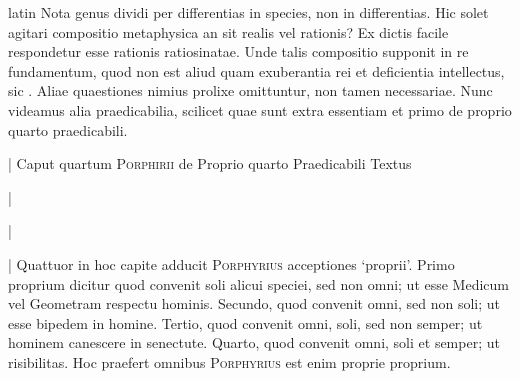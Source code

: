 \begin{otherlanguage*}{latin}
\pstart
Nota genus dividi per differentias in species, non in differentias. Hic solet agitari compositio metaphysica an sit realis vel rationis? Ex dictis facile respondetur esse rationis ratiosinatae. Unde talis compositio supponit in re fundamentum, quod non est aliud quam exuberantia rei et deficientia intellectus, sic . Aliae quaestiones nimius prolixe omittuntur, non tamen necessariae. Nunc videamus alia praedicabilia, scilicet quae sunt extra essentiam et primo de proprio quarto praedicabili. 
\pend

\pstart
{}
\pend

\pstart
{}
\pend

\pstart
\noindent%
\textnormal{|} Caput quartum \textsc{Porphirii} de Proprio quarto Praedicabili Textus 
\pend

\pstart
\textnormal{|}  
\pend

\pstart
\textnormal{|}  
\pend

\pstart
{}
\pend

\pstart
\noindent%
\textnormal{|} Quattuor in hoc capite adducit \textsc{Porphyrius} acceptiones `proprii'. Primo proprium dicitur quod convenit soli alicui speciei, sed non omni; ut esse Medicum vel Geometram respectu hominis. Secundo, quod convenit omni, sed non soli; ut esse bipedem in homine. Tertio, quod convenit omni, soli, sed non semper; ut hominem canescere in senectute. Quarto, quod convenit omni, soli et semper; ut risibilitas. Hoc praefert omnibus \textsc{Porphyrius} est enim proprie proprium. 
\pend


\end{otherlanguage*}

